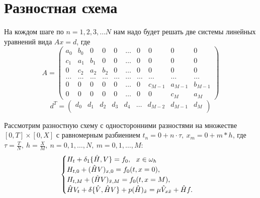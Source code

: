 \documentclass[12pt]{article}
\begin{document}
\section{Разностная схема}
На кождом шаге по $n = 1, 2, 3, \dots N$ нам надо будет решать две системы линейных уравнений вида $Ax = d$, где
\begin{equation}
A = 
    \begin{pmatrix}
         a_0 & b_0 & 0 & 0 & 0 & \dots & 0 & 0 & 0 & 0 \\
         c_1 & a_1 & b_1 & 0 & 0 & \dots & 0 & 0 & 0 & 0 \\
         0 & c_2 & a_2 & b_2 & 0 & \dots & 0 & 0 & 0 & 0 \\
         \dots & \dots & \dots & \dots & \dots & \dots & \dots & \dots & \dots & \dots \\
         0 & 0 & 0 & 0 & 0 & \dots & 0 & c_{M-1} & a_{M-1} & b_{M-1} \\
         0 & 0 & 0 & 0 & 0 & \dots & 0 & 0 & c_M & a_M
    \end{pmatrix} 
\end{equation}
\begin{equation}
d^{T} = 
    \begin{pmatrix}
         d_0 & d_1 & d_2 & d_3 & d_4 & \dots & d_{M-2} & d_{M-1} & d_M \\
    \end{pmatrix} 
\end{equation}


Рассмотрим разностную схему с односторонними разностями на множестве $[0, T] \times [0, X]$ с равномерным разбиением $t_n = 0 + n \cdot \tau, \ x_m = 0 + m * h$, где $\displaystyle \tau = \frac{T}{N}, \ h = \frac{X}{M}, \ n = 0, 1, \dots, N, \ m = 0, 1, \dots, M$:
\begin{equation}
    \begin{cases}
        $$
        H_t + \delta_1\{\hat H, V\} = f_0, \ \ x \in \omega_h \\
        H_{t, 0} + (\hat HV)_{x, 0} = f_0 (t, x = 0), \\
        H_{t, M} + (\hat HV)_{\bar{x}, M} = f_0 (t, x = M), \\
        \hat HV_t + \delta\{\hat V, \hat HV\} + p(\hat H)_{\mathring{x}} = \mu \hat V_{x \bar{x}} + \hat{H}f.
        $$
    \end{cases}
\end{equation}
\end{document}
